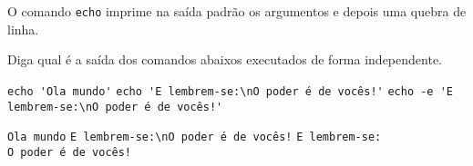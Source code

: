 \begin{Exercise}[label={0027}, difficulty={0}, origin={bash}]
  O comando \lstinline+echo+ imprime na saída padrão os argumentos e depois uma
  quebra de linha.

  Diga qual é a saída dos comandos abaixos executados de forma independente.

  \Question \lstinline+echo 'Ola mundo'+
  \Question \lstinline+echo 'E lembrem-se:\nO poder é de vocês!'+
  \Question \lstinline+echo -e 'E lembrem-se:\nO poder é de vocês!'+
\end{Exercise}
\begin{Answer}[ref={0027}]
  \Question \lstinline+Ola mundo+
  \Question \lstinline+E lembrem-se:\nO poder é de vocês!+
  \Question \lstinline+E lembrem-se:+ \\
  \lstinline+O poder é de vocês!+
\end{Answer}
